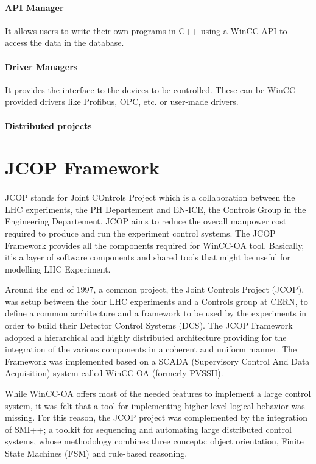 \documentclass[../main.tex]{subfiles}
\begin{document}
\paragraph{API Manager}
It allows users to write their own programs in C++ using a WinCC API to access the data in the database.

\paragraph{Driver Managers}
 It provides the interface to the devices to be controlled. These can be WinCC provided drivers like Profibus, OPC, etc. or user-made drivers.
 
\paragraph{Distributed projects}

\section{JCOP Framework}
\paragraph{}
JCOP stands for Joint COntrols Project which is a collaboration between the LHC experiments, the PH Departement and EN-ICE, the Controls Group in the Engineering Departement. 
JCOP aims to reduce the overall manpower cost required to produce and run the experiment control systems.
The JCOP Framework provides all the components required for WinCC-OA tool. 
Basically, it's a layer of software components and shared tools that might be useful for modelling LHC Experiment.
\par \noindent \newline
Around the end of 1997, a common project, the Joint Controls Project (JCOP), was setup between the four LHC experiments and a Controls group at CERN, to define a common architecture and a framework to be used by the experiments in order to build their Detector Control Systems (DCS).
The JCOP Framework adopted a hierarchical and highly distributed architecture providing for the integration of the various components in a coherent and uniform manner. 
The Framework was implemented based on a SCADA (Supervisory Control And Data Acquisition) system called WinCC-OA (formerly PVSSII).
\par \noindent \newline
While WinCC-OA offers most of the needed features to implement a large control system, it was felt that a tool for implementing higher-level logical behavior was missing.
For this reason, the JCOP project was complemented by the integration of SMI++; a toolkit for sequencing and automating large distributed control systems, whose methodology combines three concepts: object orientation, Finite State Machines (FSM) and rule-based reasoning.
\end{document}
